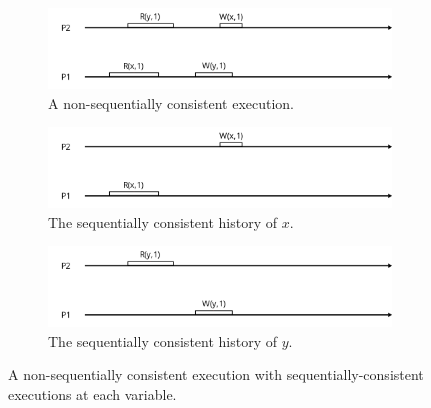 \documentclass[]             %
{NASA}                       %
\theoremstyle{definition}
\begin{document}
\begin{figure}
  \begin{subfigure}[a]{1\textwidth}
    \center
    \includegraphics[scale=0.4]{images/nonsequential1.png}
    \caption{A non-sequentially consistent execution.}
    \label{fig:nonsequential1}
  \end{subfigure}
  \begin{subfigure}[b]{1\textwidth}
    \center
    \includegraphics[scale=0.4]{images/nonsequential_x.png}
    \caption{The sequentially consistent history of $x$.}
    \label{fig:sequentialx}
  \end{subfigure}
  \begin{subfigure}[b]{1\textwidth}
    \center
    \includegraphics[scale=0.4]{images/nonsequential_y.png}
    \caption{The sequentially consistent history of $y$.}
    \label{fig:sequentialy}
  \end{subfigure}
  \caption{A non-sequentially consistent execution with sequentially-consistent executions at each variable.}
  \label{fig:nonsequential}
\end{figure}
\end{document}
